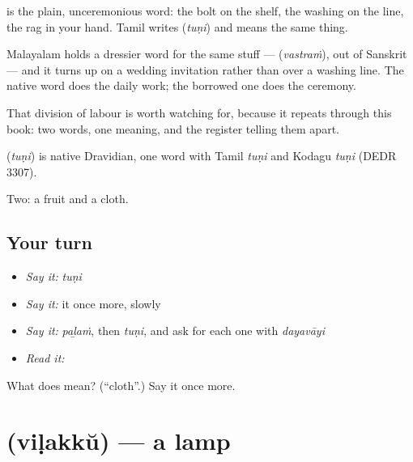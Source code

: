  is the plain, unceremonious word: the bolt on the shelf, the washing on the line, the rag in your hand. Tamil writes  (\emph{tuṇi}) and means the same thing.

Malayalam holds a dressier word for the same stuff —  (\emph{vastraṁ}), out of Sanskrit — and it turns up on a wedding invitation rather than over a washing line. The native word does the daily work; the borrowed one does the ceremony.

That division of labour is worth watching for, because it repeats through this book: two words, one meaning, and the register telling them apart.

\begin{cousinweb}
\textbf{} (\emph{tuṇi}) is native Dravidian, one word with Tamil \emph{tuṇi} and Kodagu \emph{tuṇi} (DEDR 3307).
\end{cousinweb}

\begin{grammarlens}[title={What you've built}]
Two: a fruit and a cloth.
\end{grammarlens}

\subsection*{Your turn}
\begin{itemize}
\raggedright
  \item \emph{Say it:} \emph{tuṇi}
  \item \emph{Say it:} it once more, slowly
  \item \emph{Say it:} \emph{paḻaṁ}, then \emph{tuṇi}, and ask for each one with \emph{dayavāyi}
  \item \emph{Read it:} \textbf{}
\end{itemize}

\begin{tcolorbox}[breakable,colback=teal!4,colframe=teal!35!black,title={Before you move on}]
What does  mean? (\textquotedblleft{}cloth\textquotedblright{}.) Say it once more.
\end{tcolorbox}
\section[\texorpdfstring{\ml{വിളക്ക്} (viḷakkŭ)}{വിളക്ക് (viḷakkŭ)}]{ (viḷakkŭ) — a lamp}

\label{lesson:ML-C46-lamp}



